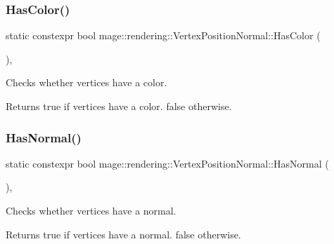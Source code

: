 \subsubsection{\texorpdfstring{Has\+Color()}{HasColor()}}
{\footnotesize\ttfamily static constexpr bool mage\+::rendering\+::\+Vertex\+Position\+Normal\+::\+Has\+Color (\begin{DoxyParamCaption}{ }\end{DoxyParamCaption})\hspace{0.3cm}{\ttfamily [static]}, {\ttfamily [noexcept]}}

Checks whether vertices have a color.

\begin{DoxyReturn}{Returns}
{\ttfamily true} if vertices have a color. {\ttfamily false} otherwise. 
\end{DoxyReturn}
\hypertarget{structmage_1_1rendering_1_1_vertex_position_normal_af5a32a3e51ce13c36b665f83f40209b6}{}\label{structmage_1_1rendering_1_1_vertex_position_normal_af5a32a3e51ce13c36b665f83f40209b6} 
\subsubsection{\texorpdfstring{Has\+Normal()}{HasNormal()}}
{\footnotesize\ttfamily static constexpr bool mage\+::rendering\+::\+Vertex\+Position\+Normal\+::\+Has\+Normal (\begin{DoxyParamCaption}{ }\end{DoxyParamCaption})\hspace{0.3cm}{\ttfamily [static]}, {\ttfamily [noexcept]}}

Checks whether vertices have a normal.

\begin{DoxyReturn}{Returns}
{\ttfamily true} if vertices have a normal. {\ttfamily false} otherwise. 
\end{DoxyReturn}
\hypertarget{structmage_1_1rendering_1_1_vertex_position_normal_a90efd74233b76b071a322d737caf3abf}{}\label{structmage_1_1rendering_1_1_vertex_position_normal_a90efd74233b76b071a322d737caf3abf} 
